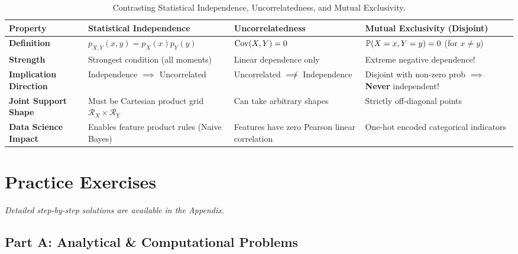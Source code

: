 \begin{table}[htbp]
\centering
\small
\begin{tabular}{p{3.2cm}p{3.8cm}p{3.8cm}p{3.5cm}}
\toprule
\textbf{Property} & \textbf{Statistical Independence} & \textbf{Uncorrelatedness} & \textbf{Mutual Exclusivity (Disjoint)} \\
\midrule
\textbf{Definition} & $p_{X,Y}(x,y) = p_X(x)p_Y(y)$ & $\Cov(X, Y) = 0$ & $\P(X=x, Y=y) = 0$ (for $x \neq y$) \\
\addlinespace
\textbf{Strength} & Strongest condition (all moments) & Linear dependence only & Extreme negative dependence! \\
\addlinespace
\textbf{Implication Direction} & Independence $\implies$ Uncorrelated & Uncorrelated $\not\implies$ Independence & Disjoint with non-zero prob $\implies$ \textbf{Never} independent! \\
\addlinespace
\textbf{Joint Support Shape} & Must be Cartesian product grid $\mathcal{R}_X \times \mathcal{R}_Y$ & Can take arbitrary shapes & Strictly off-diagonal points \\
\addlinespace
\textbf{Data Science Impact} & Enables feature product rules (Naive Bayes) & Features have zero Pearson linear correlation & One-hot encoded categorical indicators \\
\bottomrule
\end{tabular}
\caption{Contrasting Statistical Independence, Uncorrelatedness, and Mutual Exclusivity.}
\end{table}

\newpage
\section{Practice Exercises}
\textit{Detailed step-by-step solutions are available in the Appendix.}

\subsection*{Part A: Analytical \& Computational Problems}

